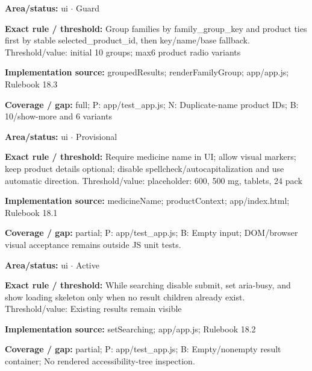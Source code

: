\begin{tcolorbox}[enhanced,breakable,colback=white,colframe=Muted!45,boxrule=0.45pt,arc=1.5pt,left=6pt,right=6pt,top=5pt,bottom=5pt,title={\texttt{UI-GROUPING-07}},title after break={\texttt{UI-GROUPING-07}\ (continued)},fonttitle=\headingfont\bfseries\color{Navy},coltitle=Navy]
\textbf{Area/status:} ui $\boldsymbol{\cdot}$ Guard\par
\smallskip
\textbf{Exact rule / threshold:} Group families by family\_\allowbreak{}group\_\allowbreak{}key and product ties first by stable selected\_\allowbreak{}product\_\allowbreak{}id, then key/\allowbreak{}name/\allowbreak{}base fallback. Threshold/\allowbreak{}value: initial 10 groups; max6 product radio variants\par
\smallskip
\textbf{Implementation source:} groupedResults; renderFamilyGroup; app/\allowbreak{}app.js; Rulebook 18.3\par
\smallskip
\textbf{Coverage / gap:} full; P: app/\allowbreak{}test\_\allowbreak{}app.js; N: Duplicate-name product IDs; B: 10/\allowbreak{}show-more and 6 variants
\end{tcolorbox}
\begin{tcolorbox}[enhanced,breakable,colback=white,colframe=Muted!45,boxrule=0.45pt,arc=1.5pt,left=6pt,right=6pt,top=5pt,bottom=5pt,title={\texttt{UI-INPUTS-01}},title after break={\texttt{UI-INPUTS-01}\ (continued)},fonttitle=\headingfont\bfseries\color{Navy},coltitle=Navy]
\textbf{Area/status:} ui $\boldsymbol{\cdot}$ Provisional\par
\smallskip
\textbf{Exact rule / threshold:} Require medicine name in UI; allow visual markers; keep product details optional; disable spellcheck/\allowbreak{}autocapitalization and use automatic direction. Threshold/\allowbreak{}value: placeholder: 600, 500 mg, tablets, 24 pack\par
\smallskip
\textbf{Implementation source:} medicineName; productContext; app/\allowbreak{}index.html; Rulebook 18.1\par
\smallskip
\textbf{Coverage / gap:} partial; P: app/\allowbreak{}test\_\allowbreak{}app.js; B: Empty input; DOM/\allowbreak{}browser visual acceptance remains outside JS unit tests.
\end{tcolorbox}
\begin{tcolorbox}[enhanced,breakable,colback=white,colframe=Muted!45,boxrule=0.45pt,arc=1.5pt,left=6pt,right=6pt,top=5pt,bottom=5pt,title={\texttt{UI-LOADING-12}},title after break={\texttt{UI-LOADING-12}\ (continued)},fonttitle=\headingfont\bfseries\color{Navy},coltitle=Navy]
\textbf{Area/status:} ui $\boldsymbol{\cdot}$ Active\par
\smallskip
\textbf{Exact rule / threshold:} While searching disable submit, set aria-busy, and show loading skeleton only when no result children already exist. Threshold/\allowbreak{}value: Existing results remain visible\par
\smallskip
\textbf{Implementation source:} setSearching; app/\allowbreak{}app.js; Rulebook 18.2\par
\smallskip
\textbf{Coverage / gap:} partial; P: app/\allowbreak{}test\_\allowbreak{}app.js; B: Empty/\allowbreak{}nonempty result container; No rendered accessibility-tree inspection.
\end{tcolorbox}
